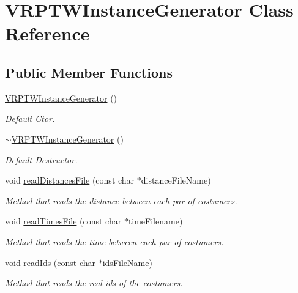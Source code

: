 \hypertarget{class_v_r_p_t_w_instance_generator}{
\section{VRPTWInstanceGenerator Class Reference}
\label{class_v_r_p_t_w_instance_generator}
}
\subsection*{Public Member Functions}
\begin{DoxyCompactItemize}
\item 
\hyperlink{class_v_r_p_t_w_instance_generator_a7cc4b0a35328897bd7e5f014cd6e44d5}{VRPTWInstanceGenerator} ()
\begin{DoxyCompactList}\small\item\em Default Ctor. \item\end{DoxyCompactList}\item 
\hyperlink{class_v_r_p_t_w_instance_generator_aaf2bb5deecf86b8133baafe4e6515d68}{$\sim$VRPTWInstanceGenerator} ()
\begin{DoxyCompactList}\small\item\em Default Destructor. \item\end{DoxyCompactList}\item 
void \hyperlink{class_v_r_p_t_w_instance_generator_aa65c7059aae206ab59d9c2fb07370695}{readDistancesFile} (const char $\ast$distanceFileName)
\begin{DoxyCompactList}\small\item\em Method that reads the distance between each par of costumers. \item\end{DoxyCompactList}\item 
void \hyperlink{class_v_r_p_t_w_instance_generator_a479178c416a2466d348c946f61a393ef}{readTimesFile} (const char $\ast$timeFilename)
\begin{DoxyCompactList}\small\item\em Method that reads the time between each par of costumers. \item\end{DoxyCompactList}\item 
void \hyperlink{class_v_r_p_t_w_instance_generator_a7e1ba90ceeec0538895951baff2f2ed5}{readIds} (const char $\ast$idsFileName)
\begin{DoxyCompactList}\small\item\em Method that reads the real ids of the costumers. \item\end{DoxyCompactList}\item 

\end{DoxyCompactItemize}
